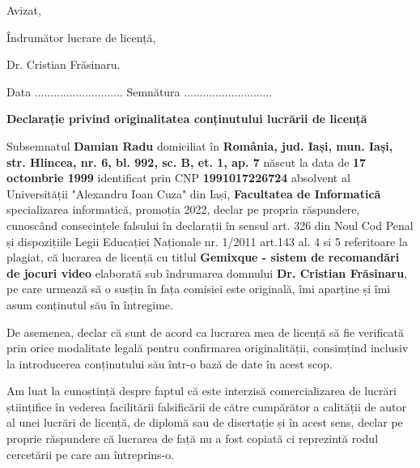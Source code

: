 \documentclass[12pt,a4paper]{report}
\newcommand{\dottedline}    {............................}
\begin{document}

\begin{titlepage} 


	\begin{FlushRight}Avizat,\end{FlushRight}
	\begin{FlushRight}Îndrumător lucrare de licență,				\end{FlushRight}
	\begin{FlushRight}Dr. Cristian Frăsinaru.
	\end{FlushRight}

	\begin{FlushRight}Data \dottedline \hspace{1cm} 	Semnătura \dottedline \end{FlushRight}

	\hfill \break

	\begin{center}
	\textbf{Declarație privind originalitatea conținutului 	lucrării de licență}
	\end{center}
	
	
	\justifying
	\hspace{1em} Subsemnatul \textbf{Damian Radu}
	domiciliat în \textbf{România, jud. Iași, mun. Iași, str. Hlincea, nr. 6, bl. 992, sc. B, et. 1, ap. 7}
	născut la data de \textbf{17 octombrie 1999} identificat prin CNP \textbf{1991017226724}
	absolvent al Universității "Alexandru Ioan Cuza" din Iași, 
	 \textbf{Facultatea de Informatică} specializarea {informatică},
	 promoția 2022, declar pe propria
	 răspundere, cunoscând consecințele falsului în
	 declarații în sensul art. 326 din Noul Cod Penal și 
	 dispozițiile Legii Educației Naționale nr. 1/2011
	 art.143 al. 4 si 5 referitoare la plagiat, că lucrarea de
	 licență cu titlul \textbf{Gemixque - sistem de recomandări de jocuri video}
	 elaborată sub îndrumarea domnului \textbf{Dr. Cristian Frăsinaru}, 
	  pe care urmează să o susțin în fața
	 comisiei este originală, îmi aparține și îmi asum 				 conținutul său în întregime. 
	 
	 \hspace{1em} De asemenea, declar că sunt de acord ca
	 lucrarea mea de licență să fie verificată prin orice
	 modalitate legală pentru confirmarea originalității,
	 consimțind inclusiv la introducerea conținutului său
	 într-o bază de date în acest scop.
	 
	 \hspace{1em} Am luat la cunoștință despre faptul că este interzisă
	 comercializarea de lucrări științifice în vederea
	 facilitării falsificării de către cumpărător a calității
	 de autor al unei lucrări de licență, de diplomă sau de
	 disertație și în acest sens, declar pe proprie răspundere
	 că lucrarea de față nu a fost copiată ci reprezintă rodul 
	 cercetării pe care am întreprins-o.
	 

\end{titlepage}
\end{document}
